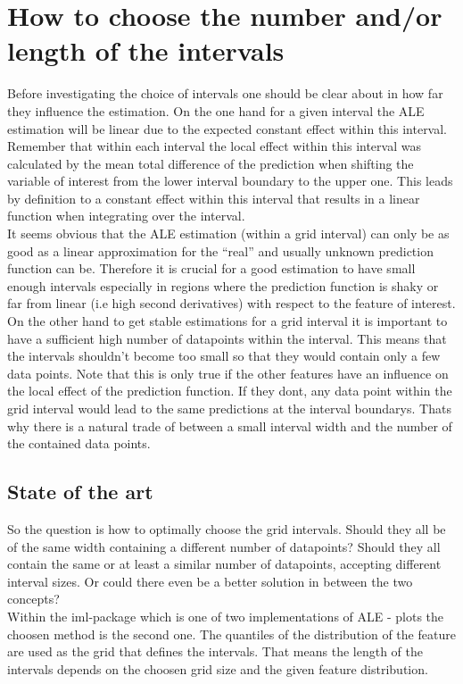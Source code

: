 \documentclass[
]{krantz}
\begin{document}
\hypertarget{how-to-choose-the-number-andor-length-of-the-intervals}{%
\section{How to choose the number and/or length of the intervals}\label{how-to-choose-the-number-andor-length-of-the-intervals}}

Before investigating the choice of intervals one should be clear about in how far they influence the estimation. On the one hand for a given interval the ALE estimation will be linear due to the expected constant effect within this interval.
Remember that within each interval the local effect within this interval was calculated by the mean total difference of the prediction when shifting the variable of interest from the lower interval boundary to the upper one. This leads by definition to a constant effect within this interval that results in a linear function when integrating over the interval.\\
It seems obvious that the ALE estimation (within a grid interval) can only be as good as a linear approximation for the ``real'' and usually unknown prediction function can be. Therefore it is crucial for a good estimation to have small enough intervals especially in regions where the prediction function is shaky or far from linear (i.e high second derivatives) with respect to the feature of interest.
On the other hand to get stable estimations for a grid interval it is important to have a sufficient high number of datapoints within the interval. This means that the intervals shouldn't become too small so that they would contain only a few data points. Note that this is only true if the other features have an influence on the local effect of the prediction function. If they dont, any data point within the grid interval would lead to the same predictions at the interval boundarys.
Thats why there is a natural trade of between a small interval width and the number of the contained data points.

\hypertarget{state-of-the-art}{%
\subsection{State of the art}\label{state-of-the-art}}

So the question is how to optimally choose the grid intervals. Should they all be of the same width containing a different number of datapoints? Should they all contain the same or at least a similar number of datapoints, accepting different interval sizes. Or could there even be a better solution in between the two concepts?\\
Within the iml-package which is one of two implementations of ALE - plots the choosen method is the second one. The quantiles of the distribution of the feature are used as the grid that defines the intervals. That means the length of the intervals depends on the choosen grid size and the given feature distribution.
\end{document}
